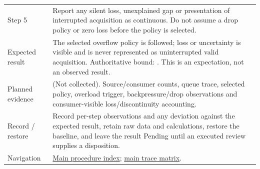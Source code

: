 \begin{tabularx}{\linewidth}{L{3.2cm}Y}
Step 5 & Report any silent loss, unexplained gap or presentation of interrupted acquisition as continuous. Do not assume a drop policy or zero loss before the policy is selected.\\
Expected result & The selected overflow policy is followed; loss or uncertainty is visible and is never represented as uninterrupted valid acquisition. Authoritative bound: . This is an expectation, not an observed result.\\
Planned evidence &  (Not collected). Source/consumer counts, queue trace, selected policy, overload trigger, backpressure/drop observations and consumer-visible loss/discontinuity accounting.\\
Record / restore & Record per-step observations and any deviation against the expected result, retain raw data and calculations, restore the baseline, and leave the result Pending until an executed review supplies a disposition.\\
Navigation & \hyperref[Table:WeekTwoTests]{Main procedure index}; \hyperref[Table:TraceabilityMatrix]{main trace matrix}.\\
\end{tabularx}
\normalsize

